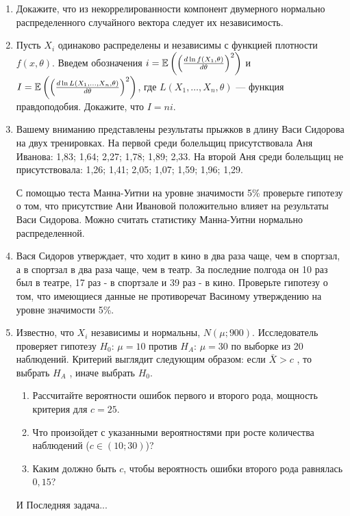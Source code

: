 \documentclass[pdftex,12pt,a4paper]{article}
\begin{document}
\begin{enumerate}
\item Докажите, что из некоррелированности компонент двумерного нормально распределенного случайного вектора следует их независимость. 
\item Пусть $X_i$ одинаково распределены и независимы с функцией плотности $f(x,\theta)$. Введем обозначения $i=\mathbb{E}\left(\left(\frac{d \ln f(X_1,\theta)}{d\theta}\right)^2\right)$ и $I=\mathbb{E}\left(\left(\frac{d \ln L(X_1,\ldots,X_n,\theta)}{d\theta}\right)^2\right)$, где $L(X_1,\ldots, X_n,\theta)$ --- функция правдоподобия. Докажите, что $I=ni$.

\item Вашему вниманию представлены результаты прыжков в длину
Васи Сидорова на двух тренировках. На первой среди болельщиц
присутствовала Аня Иванова: 1,83; 1,64; 2,27;
1,78; 1,89; 2,33. На второй Аня среди болельщиц не
присутствовала: 1,26; 1,41; 2,05; 1,07; 1,59; 1,96; 1,29.

С помощью теста Манна-Уитни на уровне значимости 5\% проверьте гипотезу о
том, что присутствие Ани Ивановой положительно влияет на
результаты Васи Сидорова. Можно считать статистику Манна-Уитни нормально распределенной.


\item Вася Сидоров утверждает, что ходит в кино в два раза чаще, чем в
спортзал, а в спортзал в два раза чаще, чем в театр. За последние
полгода он 10 раз был в театре, 17 раз - в спортзале и
39 раз - в кино. Проверьте гипотезу о том, что имеющиеся данные не противоречат Васиному утверждению на уровне значимости 5\%.


\item  Известно, что  $X_{i}$ независимы и нормальны, $N\left(\mu ;900\right)$.
Исследователь проверяет гипотезу $H_{0}$: $\mu =10$  против
$H_{A}$: $\mu =30$  по выборке из 20 наблюдений. Критерий выглядит
следующим образом: если  $\bar{X}>c$ , то выбрать  $H_{A} $ ,
иначе выбрать  $H_{0} $.
\begin{enumerate}
\item  Рассчитайте вероятности ошибок
первого и второго рода, мощность критерия для $c=25$. 
\item Что произойдет с указанными вероятностями при росте количества
наблюдений ($c\in(10;30)$)?
\item Каким должно быть $c$, чтобы вероятность ошибки второго рода
равнялась $0,15$?
\end{enumerate}




И Последняя задача...


\end{enumerate}
\end{document}

